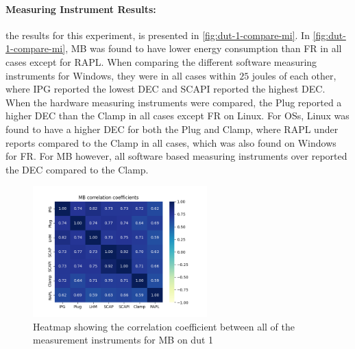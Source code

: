 \paragraph{Measuring Instrument Results:} %
the results for this experiment, is presented in \cref{fig:dut-1-compare-mi}. In \cref{fig:dut-1-compare-mi}, MB was found to have lower energy consumption than FR in all cases except for RAPL. When comparing the different software measuring instruments for Windows, they were in all cases within $25$ joules of each other, where IPG reported the lowest DEC and SCAPI reported the highest DEC. When the hardware measuring instruments were compared, the Plug reported a higher DEC than the Clamp in all cases except FR on Linux. For OSs, Linux was found to have a higher DEC for both the Plug and Clamp, where RAPL under reports compared to the Clamp in all cases, which was also found on Windows for FR. For MB however, all software based measuring instruments over reported the DEC compared to the Clamp.






\begin{figure}[H]
    \centering
    \hspace*{-1cm} %
    \includegraphics[width=0.6\textwidth]{figures/MandelbrotDut1.png}
    \caption{Heatmap showing the correlation coefficient between all of the measurement instruments for MB on dut 1}
    \label{fig:mandelCorrDut1}
\end{figure}

